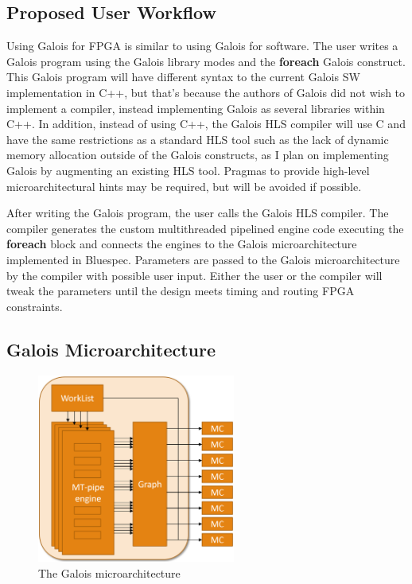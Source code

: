 \subsection{Proposed User Workflow}

Using Galois for FPGA is similar to using Galois for software. The user writes a Galois program using the Galois library modes 
and the \textbf{foreach} Galois construct. This Galois program will have different syntax to the current Galois SW 
implementation in C++, but that's because the authors of Galois did not wish to implement a compiler, instead 
implementing Galois as several libraries within C++. In addition, instead of using C++, the Galois HLS compiler will use C 
and have the same restrictions as a standard HLS tool such as the lack of dynamic memory allocation outside of the 
Galois constructs, as I plan on implementing Galois by augmenting an existing HLS tool. Pragmas to provide high-level 
microarchitectural hints may be required, but will be avoided if possible.

After writing the Galois program, the user calls the Galois HLS compiler. The compiler generates the custom 
multithreaded pipelined engine code executing the \textbf{foreach} block and connects the engines to the Galois 
microarchitecture implemented in Bluespec. Parameters are passed to the Galois microarchitecture by the compiler with 
possible user input. Either the user or the compiler will tweak the parameters until the design meets timing and 
routing FPGA constraints.

\subsection{Galois Microarchitecture}

\begin{figure}
\centering
\includegraphics[width=6.5cm, keepaspectratio]{pics/uarch.png}
\caption{The Galois microarchitecture}
\label{fig:uarch}
\end{figure}

